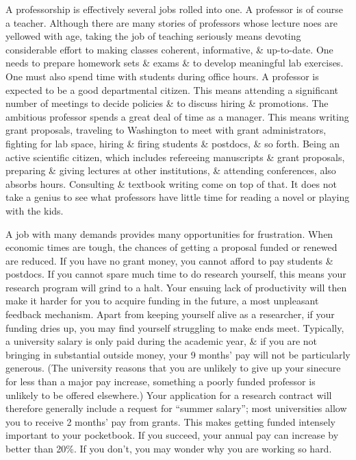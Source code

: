\documentclass{article}
\begin{document}
\begin{enumerate}
\begin{itemize}
\begin{itemize}
			A professorship is effectively several jobs rolled into one. A professor is of course a teacher. Although there are many stories of professors whose lecture noes are yellowed with age, taking the job of teaching seriously means devoting considerable effort to making classes coherent, informative, \& up-to-date. One needs to prepare homework sets \& exams \& to develop meaningful lab exercises. One must also spend time with students during office hours. A professor is expected to be a good departmental citizen. This means attending a significant number of meetings to decide policies \& to discuss hiring \& promotions. The ambitious professor spends a great deal of time as a manager. This means writing grant proposals, traveling to Washington to meet with grant administrators, fighting for lab space, hiring \& firing students \& postdocs, \& so forth. Being an active scientific citizen, which includes refereeing manuscripts \& grant proposals, preparing \& giving lectures at other institutions, \& attending conferences, also absorbs hours. Consulting \& textbook writing come on top of that. It does not take a genius to see what professors have little time for reading a novel or playing with the kids.

			A job with many demands provides many opportunities for frustration. When economic times are tough, the chances of getting a proposal funded or renewed are reduced. If you have no grant money, you cannot afford to pay students \& postdocs. If you cannot spare much time to do research yourself, this means your research program will grind to a halt. Your ensuing lack of productivity will then make it harder for you to acquire funding in the future, a most unpleasant feedback mechanism. Apart from keeping yourself alive as a researcher, if your funding dries up, you may find yourself struggling to make ends meet. Typically, a university salary is only paid during the academic year, \& if you are not bringing in substantial outside money, your 9 months' pay will not be particularly generous. (The university reasons that you are unlikely to give up your sinecure for less than a major pay increase, something a poorly funded professor is unlikely to be offered elsewhere.) Your application for a research contract will therefore generally include a request for ``summer salary''; most universities allow you to receive 2 months' pay from grants. This makes getting funded intensely important to your pocketbook. If you succeed, your annual pay can increase by better than 20\%. If you don't, you may wonder why you are working so hard.


\end{itemize}
\end{itemize}
\end{enumerate}
\end{document}
